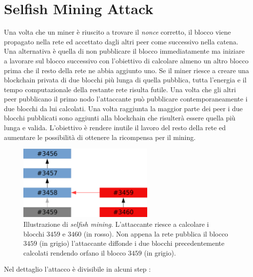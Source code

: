 \section{Selfish Mining Attack}
Una volta che un miner è riuscito a trovare il \textit{nonce} corretto, il blocco viene propagato nella rete ed accettato dagli altri peer come successivo nella catena.\newline
Una alternativa è quella di non pubblicare il blocco immediatamente ma iniziare a lavorare sul blocco successivo con l'obiettivo di calcolare almeno un altro blocco prima che il resto della rete ne abbia aggiunto uno. Se il miner riesce a creare una blockchain privata di due blocchi più lunga di quella pubblica, tutta l'energia e il tempo computazionale della restante rete risulta futile. Una volta che gli altri peer pubblicano il primo nodo l'attaccante può pubblicare contemporaneamente i due blocchi da lui calcolati. Una volta raggiunta la maggior parte dei peer i due blocchi pubblicati sono aggiunti alla blockchain che risulterà essere quella più lunga e valida. L'obiettivo è rendere inutile il lavoro del resto della rete ed aumentare le possibilità di ottenere la ricompensa per il mining.
\begin{figure}[H]
    \centering
    \includegraphics[width=0.6\textwidth]{images/selfish.png}
    \caption{Illustrazione di \textit{selfish mining}. L'attaccante riesce a calcolare i blocchi $3459$ e $3460$ (in rosso). Non appena la rete pubblica il blocco $3459$ (in grigio) l'attaccante diffonde i due blocchi precedentemente calcolati rendendo orfano il blocco $3459$ (in grigio).}
\end{figure}
Nel dettaglio l'attacco è divisibile in alcuni step \cite{selfishvitalik}:
